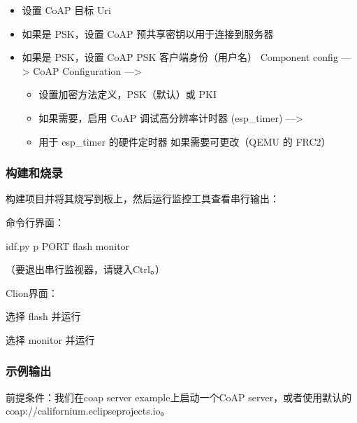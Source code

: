 \documentclass[a4paper,12pt,english]{sphinxmanual}
\begin{document}
{{\begin{itemize}
\item {} 
\sphinxAtStartPar
设置 CoAP 目标 Uri

\item {} 
\sphinxAtStartPar
如果是 PSK，设置 CoAP 预共享密钥以用于连接到服务器

\item {} 
\sphinxAtStartPar
如果是 PSK，设置 CoAP PSK 客户端身份（用户名） Component config —> CoAP Configuration —>
\begin{itemize}
\item {} 
\sphinxAtStartPar
设置加密方法定义，PSK（默认）或 PKI

\item {} 
\sphinxAtStartPar
如果需要，启用 CoAP 调试高分辨率计时器 (esp\_timer) —>

\item {} 
\sphinxAtStartPar
用于 esp\_timer 的硬件定时器 \sphinxhyphen{} 如果需要可更改（QEMU 的 FRC2）

\end{itemize}

\end{itemize}


\subsubsection{构建和烧录}
\label{\detokenize{exp-esp32/coap:id6}}
\sphinxAtStartPar
构建项目并将其烧写到板上，然后运行监控工具查看串行输出：

\sphinxAtStartPar
命令行界面：

\begin{sphinxVerbatim}[commandchars=\\\{\}]
idf.py \PYGZhy{}p PORT flash monitor
\end{sphinxVerbatim}

\sphinxAtStartPar
（要退出串行监视器，请键入Ctrl\sphinxhyphen{}{]}。）

\sphinxAtStartPar
Clion界面：

\sphinxAtStartPar
选择 flash 并运行

\sphinxAtStartPar
选择 monitor 并运行


\subsubsection{示例输出}
\label{\detokenize{exp-esp32/coap:id7}}
\sphinxAtStartPar
前提条件：我们在coap server example上启动一个CoAP server，或者使用默认的coap://californium.eclipseprojects.io。

}}
\end{document}
